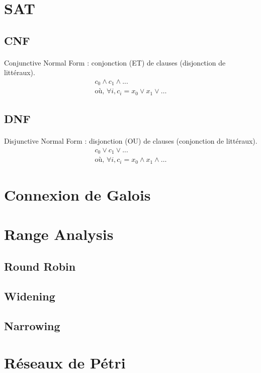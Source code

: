 \documentclass{article}
\begin{document}
  \section{SAT}
  \subsection{CNF}
  \paragraph{}
    Conjunctive Normal Form : conjonction (ET) de clauses (disjonction de littéraux).
    \begin{align*}
      c_0 \land c_1 \land ... \\
      \text{où, } \forall i, c_i = x_0 \lor x_1 \lor \ldots
    \end{align*}

  \subsection{DNF}
  \paragraph{}
    Disjunctive Normal Form : disjonction (OU) de clauses (conjonction de littéraux).
    \begin{align*}
      c_0 \lor c_1 \lor ... \\
      \text{où, } \forall i, c_i = x_0 \land x_1 \land \ldots
    \end{align*}


  \section{Connexion de Galois}
  \subsection{}

  \section{Range Analysis}
  \subsection{Round Robin}
  \subsection{Widening}
  \subsection{Narrowing}

  \section{Réseaux de Pétri}
\end{document}

